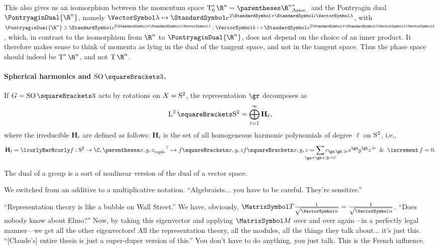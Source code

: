 \documentclass[10pt, a4paper, twoside]{lecturenotes}
\newcommand{\Rn}{{\R^n}}
\begin{document}
\begin{supplemental}
This also gives us an isomorphism between the momentum space $\CotangentSpace 0 \Rn = \Dual{\pa\Rn}$ and the Pontryagin dual $\PontryaginDual \Rn$, namely $\FunctionBody \vgl {\E^{2 \Pi \I \vgl }}$, with $\PontryaginDual \Rn\owns\FunctionNamedBody{\E^{2 \Pi \I \vgl}} \vk {\E^{2 \Pi \I \vgl\vk}}$, which, in contrast to the isomorphism from $\Rn$ to $\PontryaginDual\Rn$, does not depend on the choice of an inner product. It therefore makes sense to think of momenta as lying in the dual of the tangent space, and not in the tangent space. Thus the phase space should indeed be $\CotangentBundle \Rn$, and not $\TangentBundle \Rn$.

\paragraph{Spherical harmonics and $\SpecialOrthogonalGroup\of 3$.} 
\newcommand{\degL}{\ell}
\newcommand{\Harmonic}[1]{\mathbf{H}_{#1}}
If $G=\SpecialOrthogonalGroup\of 3$ acts by rotations on $X=\mathrm{S}^{2}$, the representation $\gr$ decomposes as 
\begin{equation*}
\Lspace[2]\of{\UnitSphere 2} = \DirectSumOver{\degL=1}[\infty] \Harmonic\degL\text{,}
\end{equation*}
where the irreducible $\Harmonic\degL$ are defined as follows: $\Harmonic\degL$ is the set of all homogeneous harmonic polynomials of degree $\degL$ on $\mathrm{S}^{2}$, i.e.,
\begin{equation*}
\Harmonic\degL = \setst{\FunctionSpec f {\UnitSphere 2} \C, \FunctionBody {\Transpose{\tuple{x,y,z}}} {f\of{x,y,z}}}{f\of{x,y,z} = \sum {\ga+\gb+\gg = \degL} c_{\ga\,\gb\,\gg} x^{\ga}y^{\gb}z^{\gg} \And \Laplacian f = 0  }\text{.}
\end{equation*}
\endgroup
\end{supplemental}
\NewLecture[date=2013-03-21, official=true]
\begingroup
\newcommand{\vsqrtninv}{\frac{1}{\sqrt{\vn}}}
The dual of a group is a sort of nonlinear version of the dual of a vector space.

We switched from an additive to a multiplicative notation. ``Algebraists... you have to be careful. They're sensitive.''

``Representation theory is like a bubble on Wall Street.'' We have, obviously, $\matT  \vsqrtninv = \vsqrtninv$. ``Does nobody know about Elmo?''  Now, by taking this eigenvector and applying $\matM$ over and over again---in a perfectly legal manner---we get all the other eigenvectors! All the representation theory, all the modules, all the things they talk about... it's just this. ``[Claude's] entire thesis is just a super-duper version of this.'' You don't have to do anything, you just talk. This is the French influence.
\end{document}
